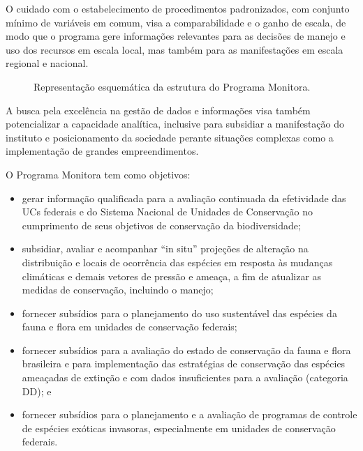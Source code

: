 \documentclass[
  letterpaper,
]{scrbook}
\begin{document}
O cuidado com o estabelecimento de procedimentos padronizados, com
conjunto mínimo de variáveis em comum, visa a comparabilidade e o ganho
de escala, de modo que o programa gere informações relevantes para as
decisões de manejo e uso dos recursos em escala local, mas também para
as manifestações em escala regional e nacional.

\begin{figure}[H]


\caption{\label{fig-eixos-tematicos-monitora}Representação esquemática
da estrutura do Programa Monitora.}

\end{figure}%

A busca pela excelência na gestão de dados e informações visa também
potencializar a capacidade analítica, inclusive para subsidiar a
manifestação do instituto e posicionamento da sociedade perante
situações complexas como a implementação de grandes empreendimentos.

O Programa Monitora tem como objetivos:

\begin{itemize}
\item
  gerar informação qualificada para a avaliação continuada da
  efetividade das UCs federais e do Sistema Nacional de Unidades de
  Conservação no cumprimento de seus objetivos de conservação da
  biodiversidade;
\item
  subsidiar, avaliar e acompanhar ``in situ'' projeções de alteração na
  distribuição e locais de ocorrência das espécies em resposta às
  mudanças climáticas e demais vetores de pressão e ameaça, a fim de
  atualizar as medidas de conservação, incluindo o manejo;
\item
  fornecer subsídios para o planejamento do uso sustentável das espécies
  da fauna e flora em unidades de conservação federais;
\item
  fornecer subsídios para a avaliação do estado de conservação da fauna
  e flora brasileira e para implementação das estratégias de conservação
  das espécies ameaçadas de extinção e com dados insuficientes para a
  avaliação (categoria DD); e
\item
  fornecer subsídios para o planejamento e a avaliação de programas de
  controle de espécies exóticas invasoras, especialmente em unidades de
  conservação federais.
\end{itemize}
\end{document}
